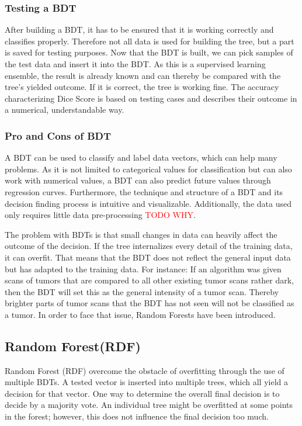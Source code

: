 \documentclass[
12pt,
headsepline,
bibliography=totoc,
twoside=semi,
fleqn
]{scrartcl}
\begin{document}
 \subsubsection{Testing a BDT\label{sec:sec2-1-4}}
 After building a BDT, it has to be ensured that it is working correctly and classifies properly. Therefore not all data is used for building the tree, but a part is saved for testing purposes. Now that the BDT is built, we can pick samples of the test data and insert it into the BDT. As this is a supervised learning ensemble, the result is already known and can thereby be compared with the tree's yielded outcome. If it is correct, the tree is working fine. The accuracy characterizing Dice Score is based on testing cases and describes their outcome in a numerical, understandable way. 

 \subsubsection{Pro and Cons of BDT\label{sec:sec2-1-5}}
 A BDT can be used to classify and label data vectors, which can help many problems. As it is not limited to categorical values for classification but can also work with numerical values, a BDT can also predict future values through regression curves. Furthermore, the technique and structure of a BDT and its decision finding process is intuitive and visualizable. Additionally, the data used only requires little data pre-processing \textcolor{red}{TODO WHY}.

 The problem with BDTs is that small changes in data can heavily affect the outcome of the decision. If the tree internalizes every detail of the training data, it can overfit. That means that the BDT does not reflect the general input data but has adapted to the training data. For instance: If an algorithm was given scans of tumors that are compared to all other existing tumor scans rather dark, then the BDT will set this as the general intensity of a tumor scan. Thereby brighter parts of tumor scans that the BDT has not seen will not be classified as a tumor. In order to face that issue, Random Forests have been introduced. 

 \subsection{Random Forest(RDF)\label{sec:sec2-2}}
 Random Forest (RDF) overcome the obstacle of overfitting through the use of multiple BDTs. A tested vector is inserted into multiple trees, which all yield a decision for that vector. One way to determine the overall final decision is to decide by a majority vote. An individual tree might be overfitted at some points in the forest; however, this does not influence the final decision too much. 
\end{document}
